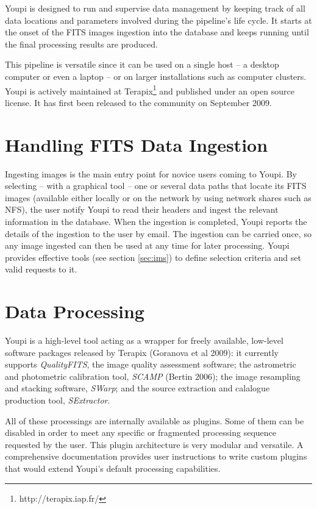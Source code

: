 \documentclass[11pt,twoside]{article}  %
\begin{document}
Youpi is designed to run and supervise data management by keeping track of all data locations 
and parameters involved during the pipeline's life cycle. It starts at the onset of the FITS 
images ingestion into the database and keeps running until the final processing results are 
produced.

This pipeline is versatile since it can be used on a single host -- a desktop computer or even 
a laptop -- or on larger installations such as computer clusters. Youpi is actively maintained 
at Terapix\footnote{http://terapix.iap.fr/} and published under an open source license. It has 
first been released to the community on September 2009.

\section{Handling FITS Data Ingestion}

Ingesting images is the main entry point for novice users coming to Youpi. By selecting -- with 
a graphical tool -- one or several data paths that locate its FITS images (available either 
locally or on the network by using network shares such as NFS), the user notify Youpi to read 
their headers and ingest the relevant information in the database. When the ingestion is completed, 
Youpi reports the details of the ingestion to the user by email. The ingestion can be carried 
once, so any image ingested can then be used at any time for later processing. Youpi provides 
effective tools (see section \ref{sec:ims}) to define selection criteria and set valid requests 
to it. 

\section{Data Processing}

Youpi is a high-level tool acting as a wrapper for freely available, low-level software packages 
released by Terapix (Goranova et al 2009): it currently supports \emph{QualityFITS}, the image 
quality assessment software; the astrometric and photometric calibration tool, \emph{SCAMP} 
(Bertin 2006); the image resampling and stacking software, \emph{SWarp}; and the source extraction 
and calalogue production tool, \emph{SExtractor}.

All of these processings are internally available as plugins. Some of them can be disabled 
in order to meet any specific or fragmented processing sequence requested by the user. This 
plugin architecture is very modular and versatile. A comprehensive documentation provides user 
instructions to write custom plugins that would extend Youpi's default processing capabilities.
\end{document}
